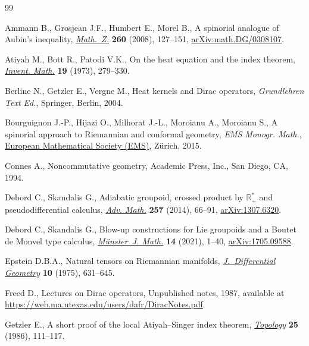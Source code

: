 \begin{thebibliography}{99}
\footnotesize\itemsep=0pt

Ammann B., Grosjean J.F., Humbert E., Morel B., A spinorial analogue of
 {A}ubin's inequality, \href{https://doi.org/10.1007/s00209-007-0266-5}{\textit{Math.~Z.}} \textbf{260} (2008), 127--151,
 \href{https://arxiv.org/abs/math.DG/0308107}{arXiv:math.DG/0308107}.

Atiyah M., Bott R., Patodi V.K., On the heat equation and the index theorem,
 \href{https://doi.org/10.1007/BF01425417}{\textit{Invent. Math.}} \textbf{19} (1973), 279--330.

Berline N., Getzler E., Vergne M., Heat kernels and {D}irac operators,
 \textit{Grundlehren Text Ed.}, Springer, Berlin, 2004.

Bourguignon J.-P., Hijazi O., Milhorat J.-L., Moroianu A., Moroianu S., A
 spinorial approach to {R}iemannian and conformal geometry, \textit{EMS Monogr. Math.},
 \href{https://doi.org/10.4171/136}{European Mathematical Society (EMS)}, Z\"urich, 2015.

Connes A., Noncommutative geometry, Academic Press, Inc., San Diego, CA, 1994.

Debord C., Skandalis G., Adiabatic groupoid, crossed product by
 {$\mathbb{R}_+^\ast$} and pseudodifferential calculus, \href{https://doi.org/10.1016/j.aim.2014.02.012}{\textit{Adv. Math.}}
 \textbf{257} (2014), 66--91, \href{https://arxiv.org/abs/1307.6320}{arXiv:1307.6320}.

Debord C., Skandalis G., Blow-up constructions for {L}ie groupoids and a
 {B}outet de {M}onvel type calculus, \href{https://doi.org/10.17879/59019640550}{\textit{M\"unster~J. Math.}} \textbf{14}
 (2021), 1--40, \href{https://arxiv.org/abs/1705.09588}{arXiv:1705.09588}.

Epstein D.B.A., Natural tensors on {R}iemannian manifolds,
 \href{https://doi.org/10.4310/jdg/1214433166}{\textit{J.~Differential Geometry}} \textbf{10} (1975), 631--645.

Freed D., Lectures on Dirac operators, {U}npublished notes, 1987, available at
 \url{https://web.ma.utexas.edu/users/dafr/DiracNotes.pdf}.

Getzler E., A short proof of the local {A}tiyah--{S}inger index theorem,
 \href{https://doi.org/10.1016/0040-9383(86)90008-X}{\textit{Topology}} \textbf{25} (1986), 111--117.


\end{thebibliography}
